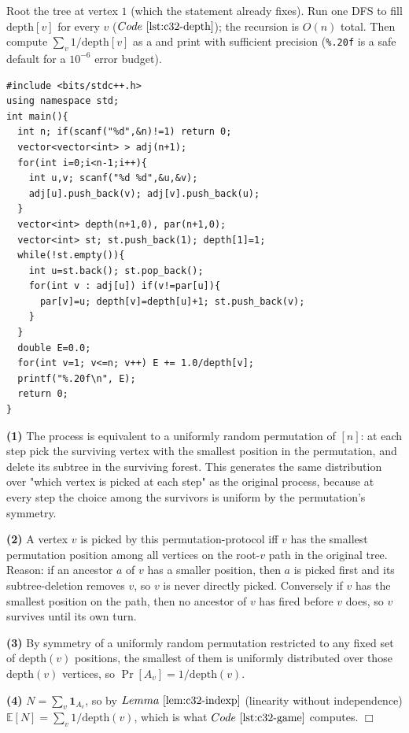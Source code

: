 Root the tree at vertex \(1\) (which the statement already fixes).  Run one
DFS to fill \(\mathrm{depth}[v]\) for every \(v\) (\(\coderef{c32-depth}\));
the recursion is \(O(n)\) total.  Then compute \(\sum_v 1/\mathrm{depth}[v]\)
as a  and print with sufficient precision (\texttt{\%.20f} is a
safe default for a \(10^{-6}\) error budget).

\begin{lstlisting}[caption={CF 280C. Iterative DFS for depth, sum reciprocal depths, print with wide precision. The iterative stack avoids recursion-depth issues at n=1e5. ASCII only, identifiers without underscores}, label={lst:c32-game}]
#include <bits/stdc++.h>
using namespace std;
int main(){
  int n; if(scanf("%d",&n)!=1) return 0;
  vector<vector<int> > adj(n+1);
  for(int i=0;i<n-1;i++){
    int u,v; scanf("%d %d",&u,&v);
    adj[u].push_back(v); adj[v].push_back(u);
  }
  vector<int> depth(n+1,0), par(n+1,0);
  vector<int> st; st.push_back(1); depth[1]=1;
  while(!st.empty()){
    int u=st.back(); st.pop_back();
    for(int v : adj[u]) if(v!=par[u]){
      par[v]=u; depth[v]=depth[u]+1; st.push_back(v);
    }
  }
  double E=0.0;
  for(int v=1; v<=n; v++) E += 1.0/depth[v];
  printf("%.20f\n", E);
  return 0;
}
\end{lstlisting}

\begin{proofbox}
\textbf{(1)} The process is equivalent to a uniformly random permutation of
\([n]\): at each step pick the surviving vertex with the smallest position
in the permutation, and delete its subtree in the surviving forest.  This
generates the same distribution over "which vertex is picked at each step"
as the original process, because at every step the choice among the
survivors is uniform by the permutation's symmetry.

\textbf{(2)} A vertex \(v\) is picked by this permutation-protocol iff \(v\)
has the smallest permutation position among all vertices on the root-\(v\)
path in the original tree.  Reason: if an ancestor \(a\) of \(v\) has a
smaller position, then \(a\) is picked first and its subtree-deletion
removes \(v\), so \(v\) is never directly picked.  Conversely if \(v\) has
the smallest position on the path, then no ancestor of \(v\) has fired
before \(v\) does, so \(v\) survives until its own turn.

\textbf{(3)} By symmetry of a uniformly random permutation restricted to
any fixed set of \(\mathrm{depth}(v)\) positions, the smallest of them is
uniformly distributed over those \(\mathrm{depth}(v)\) vertices, so
\(\Pr[A_v] = 1/\mathrm{depth}(v)\).

\textbf{(4)} \(N=\sum_v \mathbf{1}_{A_v}\), so by \(\lemref{c32-indexp}\)
(linearity without independence) \(\mathbb{E}[N]=\sum_v 1/\mathrm{depth}(v)\),
which is what \(\coderef{c32-game}\) computes. \(\Box\)
\end{proofbox}

